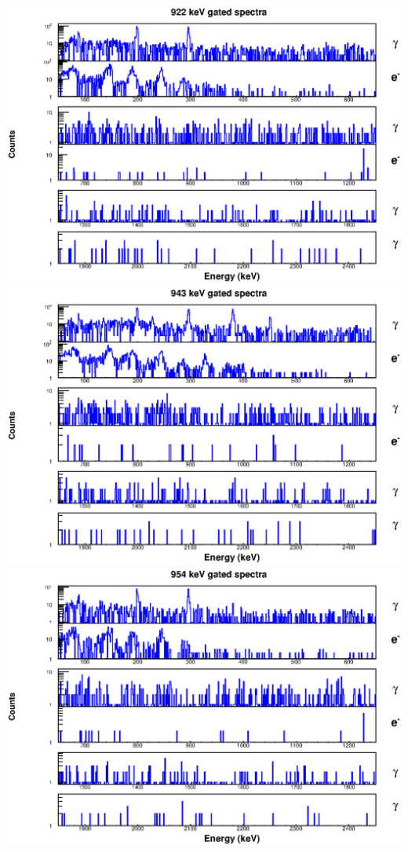 \includegraphics[scale=0.8]{156Gd_Appendix/922_combined.eps}
\includegraphics[scale=0.8]{156Gd_Appendix/943_combined.eps}
\includegraphics[scale=0.8]{156Gd_Appendix/954_combined.eps}
